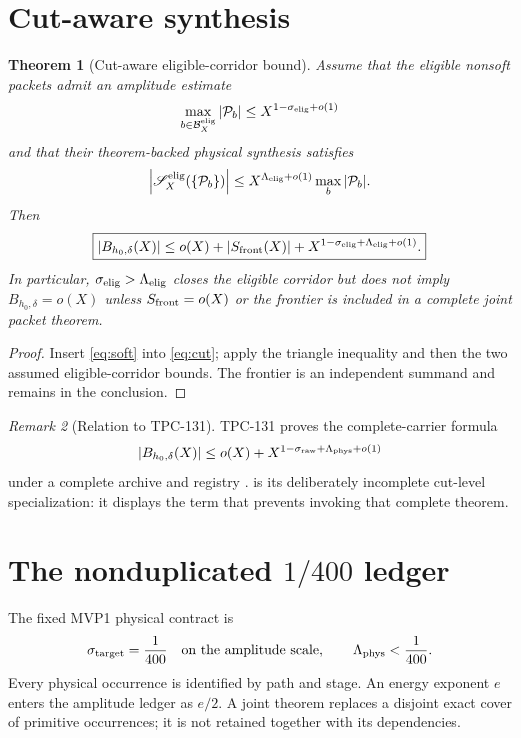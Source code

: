 \documentclass[11pt]{article}
\newtheorem{theorem}{Theorem}[section]
\theoremstyle{definition}
\theoremstyle{remark}
\newtheorem{remark}[theorem]{Remark}
\newcommand{\Bhard}{B_{h_0,\delta}}
\begin{document}
\section{Cut-aware synthesis}

\begin{theorem}[Cut-aware eligible-corridor bound]
\label{thm:cut-aware}
Assume that the eligible nonsoft packets admit an amplitude estimate
\[
 \max_{b\in\mathcal B_X^{\rm elig}}|\mathcal P_b|
 \le X^{1-\sigma_{\rm elig}+o(1)}
\]
and that their theorem-backed physical synthesis satisfies
\[
 \left|\mathscr S_X^{\rm elig}(\{\mathcal P_b\})\right|
 \le
 X^{\Lambda_{\rm elig}+o(1)}
 \max_b|\mathcal P_b|.
\]
Then
\[
 \boxed{
 |\Bhard(X)|
 \le
 o(X)+|S_{\rm front}(X)|
 +X^{1-\sigma_{\rm elig}+\Lambda_{\rm elig}+o(1)}.}
\]
In particular, \(\sigma_{\rm elig}>\Lambda_{\rm elig}\) closes the
eligible corridor but does not imply \(\Bhard=o(X)\) unless
\(S_{\rm front}=o(X)\) or the frontier is included in a complete
joint packet theorem.
\end{theorem}

\begin{proof}
Insert \eqref{eq:soft} into \eqref{eq:cut}; apply the triangle
inequality and then the two assumed eligible-corridor bounds.  The
frontier is an independent summand and remains in the conclusion.
\end{proof}

\begin{remark}[Relation to TPC-131]
TPC-131 proves the complete-carrier formula
\[
 |B_{h_0,\delta}(X)|
 \le o(X)+X^{1-\sigma_{\rm raw}+\Lambda_{\rm phys}+o(1)}
\]
under a complete archive and registry \citep{WangTPC131}.
 is its deliberately incomplete cut-level
specialization: it displays the term that prevents invoking that
complete theorem.
\end{remark}

\section{The nonduplicated \texorpdfstring{\(1/400\)}{1/400} ledger}

The fixed MVP1 physical contract is
\[
 \sigma_{\rm target}=\frac1{400}
 \quad\text{on the amplitude scale},\qquad
 \Lambda_{\rm phys}<\frac1{400}.
\]
Every physical occurrence is identified by path and stage.  An
energy exponent \(e\) enters the amplitude ledger as \(e/2\).
A joint theorem replaces a disjoint exact cover of primitive
occurrences; it is not retained together with its dependencies.
\end{document}
